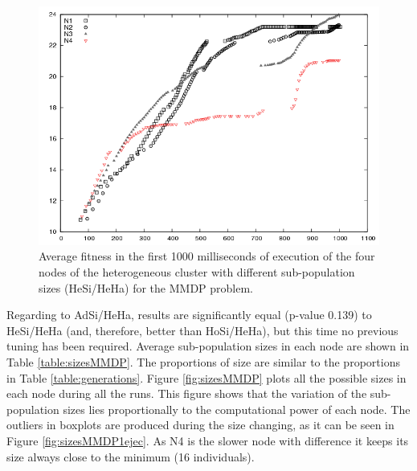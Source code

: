 \begin{figure}
\centering
 \includegraphics[scale =0.4] {gfx/adaptiveresults/generationsMMDPheterosize.png}
\caption{Average fitness in the first 1000 milliseconds of execution of the four nodes of the heterogeneous cluster with different sub-population sizes (HeSi/HeHa) for the MMDP problem.}
\label{fig:hesiheha}
\end{figure}

Regarding to AdSi/HeHa, %
results are significantly  equal (p-value 0.139) to HeSi/HeHa (and, therefore, better than HoSi/HeHa), but this time no previous tuning has been required.  Average sub-population sizes in each node are shown in Table \ref{table:sizesMMDP}. The proportions of size are similar to the proportions in Table \ref{table:generations}. Figure \ref{fig:sizesMMDP} plots all the possible sizes in each node during all the runs. This figure shows that the variation of the sub-population sizes lies proportionally to the computational power of each node. The outliers in boxplots are produced during the size changing, as it can be seen in Figure \ref{fig:sizesMMDP1ejec}. As N4 is the slower node with difference it keeps its size always close to the minimum (16 individuals).

